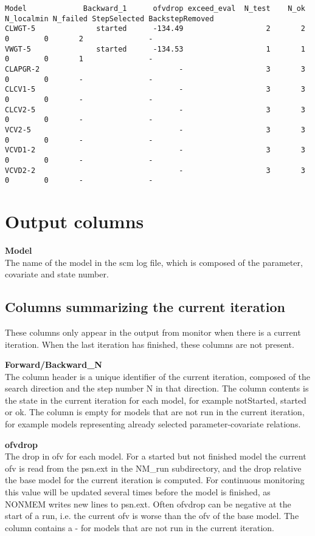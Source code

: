 \documentclass[hideglossary,notoc,hidelof,hidelot,hideTheSignaturePage,hideLinkCurrent,hideloa,pdfLatex,noClient,notitle,hideConfidential]{PMXstyle-20170118kajsa4}
\begin{document}
{\begin{verbatim}
Model             Backward_1      ofvdrop exceed_eval  N_test    N_ok N_localmin N_failed StepSelected BackstepRemoved
CLWGT-5              started      -134.49                   2       2          0        0       2               -
VWGT-5               started      -134.53                   1       1          0        0       1               -
CLAPGR-2                                -                   3       3          0        0       -               -
CLCV1-5                                 -                   3       3          0        0       -               -
CLCV2-5                                 -                   3       3          0        0       -               -
VCV2-5                                  -                   3       3          0        0       -               -
VCVD1-2                                 -                   3       3          0        0       -               -
VCVD2-2                                 -                   3       3          0        0       -               -

\end{verbatim}
}

\section{Output columns}
{\bfseries Model}\\
The name of the model in the scm log file, which is composed of the parameter, covariate and state number.

\subsection{Columns summarizing the current iteration}
These columns only appear in the output from monitor when there is a current iteration. 
When the last iteration has finished, these columns are not present.

{\bfseries Forward/Backward\_N} \\
The column header is a unique identifier of the current iteration, composed of the search direction and the step number N in that direction. The column contents is the state in the current iteration 
for each model, for example notStarted, started or ok. 
The column is empty for models that are not run in the current iteration, for example models
representing already selected parameter-covariate relations.

{\bfseries ofvdrop}\\
The drop in ofv for each model. For a started but not finished model the current ofv is read from 
the psn.ext in the NM\_run subdirectory, and the drop relative the base model for the current iteration
is computed. For continuous monitoring this value will be updated several
times before the model is finished, as NONMEM writes new lines to psn.ext. 
Often ofvdrop can be negative at the start of a run, i.e. the current ofv is 
worse than the ofv of the base model. 
The column contains a - for models that are not run in the current iteration.
\end{document}
